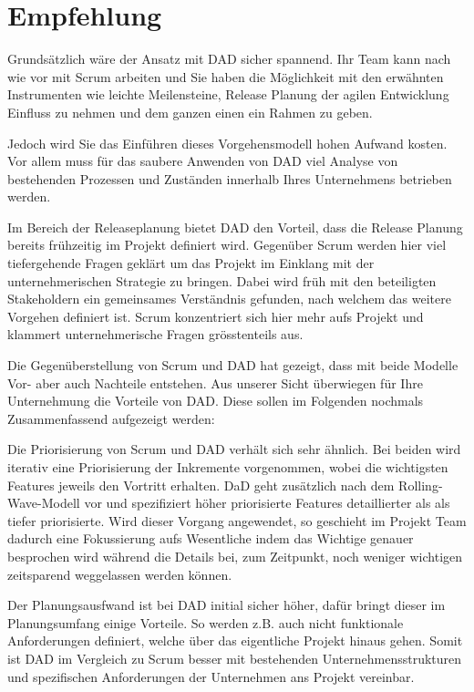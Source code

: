 \section{Empfehlung}

Grundsätzlich wäre der Ansatz mit DAD sicher spannend. Ihr Team kann nach wie vor mit Scrum arbeiten und Sie haben die Möglichkeit mit den erwähnten Instrumenten wie leichte Meilensteine, Release Planung der agilen Entwicklung Einfluss zu nehmen und dem ganzen einen ein Rahmen zu geben.

Jedoch wird Sie das Einführen dieses Vorgehensmodell hohen Aufwand kosten. Vor allem muss für das saubere Anwenden von DAD viel Analyse von bestehenden Prozessen und Zuständen innerhalb Ihres Unternehmens betrieben werden.

Im Bereich der Releaseplanung bietet DAD den Vorteil, dass die Release Planung bereits frühzeitig im Projekt definiert wird. Gegenüber Scrum werden hier viel tiefergehende Fragen geklärt um das Projekt im Einklang mit der unternehmerischen Strategie zu bringen. Dabei wird früh mit den beteiligten Stakeholdern ein gemeinsames Verständnis gefunden, nach welchem das weitere Vorgehen definiert ist. Scrum konzentriert sich hier mehr aufs Projekt und klammert unternehmerische Fragen grösstenteils aus.

Die Gegenüberstellung von Scrum und DAD hat gezeigt, dass mit beide Modelle Vor- aber auch Nachteile entstehen. Aus unserer Sicht überwiegen für Ihre Unternehmung die Vorteile von DAD. Diese sollen im Folgenden nochmals Zusammenfassend aufgezeigt werden:

Die Priorisierung von Scrum und DAD verhält sich sehr ähnlich. Bei beiden wird iterativ eine Priorisierung der Inkremente vorgenommen, wobei die wichtigsten Features jeweils den Vortritt erhalten. DaD geht zusätzlich nach dem Rolling-Wave-Modell vor und spezifiziert höher priorisierte Features detaillierter als als tiefer priorisierte. Wird dieser Vorgang angewendet, so geschieht im Projekt Team dadurch eine Fokussierung aufs Wesentliche indem das Wichtige genauer besprochen wird während die Details bei, zum Zeitpunkt, noch weniger wichtigen zeitsparend weggelassen werden können.

Der Planungsausfwand ist bei DAD initial sicher höher, dafür bringt dieser im Planungsumfang einige Vorteile. So werden z.B. auch nicht funktionale Anforderungen definiert, welche über das eigentliche Projekt hinaus gehen. Somit ist DAD im Vergleich zu Scrum besser mit bestehenden Unternehmensstrukturen und spezifischen Anforderungen der Unternehmen ans Projekt vereinbar. \newline

